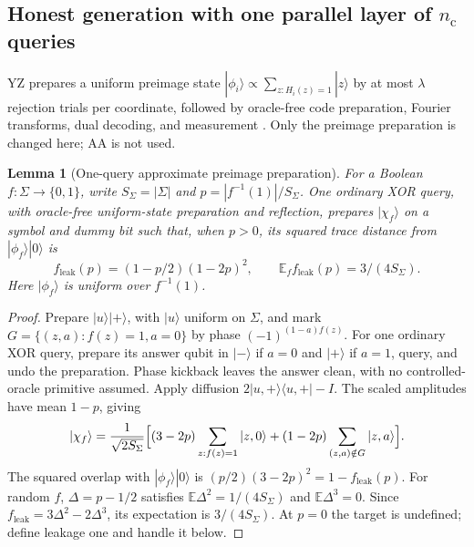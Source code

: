\documentclass[11pt]{article}
\newtheorem{lemma}[theorem]{Lemma}
\theoremstyle{definition}\newtheorem{definition}[theorem]{Definition}
\theoremstyle{remark}\newtheorem{remark}[theorem]{Remark}
\newcommand{\E}{\mathbb E}\newcommand{\Prb}{\mathbb P}
\begin{document}
\subsection{Honest generation with one parallel layer of \texorpdfstring{\(n_{\mathrm c}\)}{nc} queries}
YZ prepares a uniform preimage state \(|\phi_i\rangle\propto\sum_{z:H_i(z)=1}|z\rangle\) by at most \(\lambda\) rejection trials per coordinate, followed by oracle-free code preparation, Fourier transforms, dual decoding, and measurement \cite[Section~6 and Lemma~6.3]{YZ24}. Only the preimage preparation is changed here; AA is not used.

\begin{lemma}[One-query approximate preimage preparation]\label{lem:preimage}
For a Boolean \(f:\Sigma\to\{0,1\}\), write \(S_\Sigma=|\Sigma|\) and \(p=|f^{-1}(1)|/S_\Sigma\). One ordinary XOR query, with oracle-free uniform-state preparation and reflection, prepares \(|\chi_f\rangle\) on a symbol and dummy bit such that, when \(p>0\), its squared trace distance from \(|\phi_f\rangle|0\rangle\) is
\[
 f_{\mathrm{leak}}(p)=(1-p/2)(1-2p)^2,\qquad\E_ff_{\mathrm{leak}}(p)=3/(4S_\Sigma).
\]
Here \(|\phi_f\rangle\) is uniform over \(f^{-1}(1)\).
\end{lemma}
\begin{proof}
Prepare \(|u\rangle|+\rangle\), with \(|u\rangle\) uniform on \(\Sigma\), and mark \(G=\{(z,a):f(z)=1,a=0\}\) by phase \((-1)^{(1-a)f(z)}\). For one ordinary XOR query, prepare its answer qubit in \(|-\rangle\) if \(a=0\) and \(|+\rangle\) if \(a=1\), query, and undo the preparation. Phase kickback leaves the answer clean, with no controlled-oracle primitive assumed. Apply diffusion \(2|u,+\rangle\langle u,+|-I\). The scaled amplitudes have mean \(1-p\), giving
\[
 |\chi_f\rangle=\frac1{\sqrt{2S_\Sigma}}\Bigl[(3-2p)\sum_{z:f(z)=1}|z,0\rangle+(1-2p)\sum_{(z,a)\notin G}|z,a\rangle\Bigr].
\]
The squared overlap with \(|\phi_f\rangle|0\rangle\) is \((p/2)(3-2p)^2=1-f_{\mathrm{leak}}(p)\). For random \(f\), \(\Delta=p-1/2\) satisfies \(\E\Delta^2=1/(4S_\Sigma)\) and \(\E\Delta^3=0\). Since \(f_{\mathrm{leak}}=3\Delta^2-2\Delta^3\), its expectation is \(3/(4S_\Sigma)\). At \(p=0\) the target is undefined; define leakage one and handle it below.
\end{proof}
\end{document}
